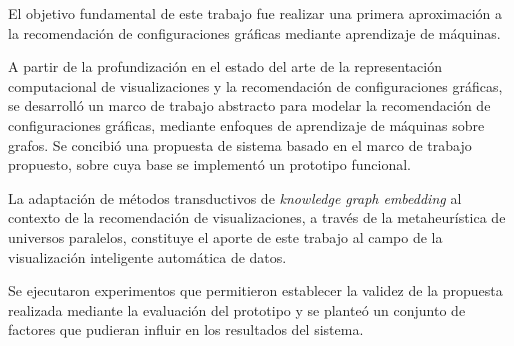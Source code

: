 \begin{conclusions}
    El objetivo fundamental de este trabajo fue realizar una primera
    aproximaci\'on a la recomendaci\'on de configuraciones
    gr\'aficas mediante aprendizaje de m\'aquinas.
   
    A partir de la profundizaci\'on en el estado del arte de la representaci\'on
    computacional de visualizaciones y la recomendaci\'on de configuraciones gr\'aficas, se desarroll\'o un marco
    de trabajo abstracto para modelar la recomendaci\'on de configuraciones gr\'aficas,
    mediante enfoques de aprendizaje de m\'aquinas sobre grafos. Se concibi\'o
    una propuesta de sistema basado en el marco de trabajo propuesto, sobre cuya base se implement\'o un prototipo funcional.

    La adaptaci\'on de m\'etodos transductivos de \textit{knowledge graph embedding} 
    al contexto de la recomendaci\'on de visualizaciones, a
    trav\'es de la metaheur\'istica de universos paralelos, constituye el 
    aporte de este trabajo al campo de la visualizaci\'on inteligente autom\'atica de datos.
    
    Se ejecutaron experimentos que permitieron establecer
    la validez de la propuesta realizada mediante la evaluaci\'on del prototipo y
    se plante\'o un conjunto de factores que pudieran influir en los resultados
    del sistema. 
\end{conclusions}
